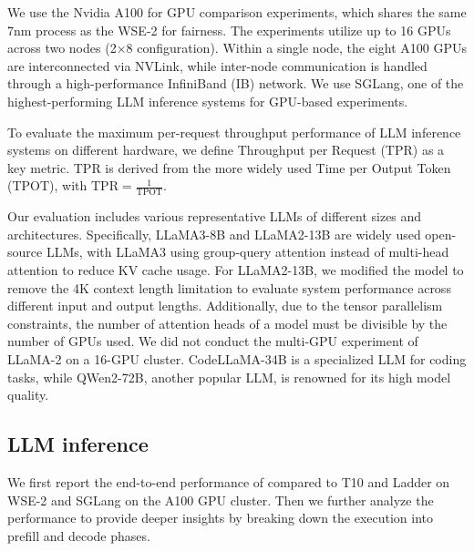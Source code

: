 We use the Nvidia A100 for GPU comparison experiments, which shares the same 7nm process as the WSE-2 for fairness. The experiments utilize up to 16 GPUs across two nodes (2$\times$8 configuration). Within a single node, the eight A100 GPUs are interconnected via NVLink, while inter-node communication is handled through a high-performance InfiniBand (IB) network. We use SGLang\cite{sglang}, one of the highest-performing LLM inference systems for GPU-based experiments.

 To evaluate the maximum per-request throughput performance of LLM inference systems on different hardware, we define Throughput per Request (TPR) as a key metric. TPR is derived from the more widely used Time per Output Token (TPOT), with $\text{TPR} = \frac{1}{\text{TPOT}}$.

Our evaluation includes various representative LLMs of different sizes and architectures. Specifically, LLaMA3-8B and LLaMA2-13B are widely used open-source LLMs, with LLaMA3 using group-query attention instead of multi-head attention to reduce KV cache usage. For LLaMA2-13B, we modified the model to remove the 4K context length limitation to evaluate system performance across different input and output lengths. Additionally, due to the tensor parallelism constraints, the number of attention heads of a model must be divisible by the number of GPUs used. We did not conduct the multi-GPU experiment of LLaMA-2 on a 16-GPU cluster. CodeLLaMA-34B is a specialized LLM for coding tasks, while QWen2-72B, another popular LLM, is renowned for its high model quality.

\vspace{-0.2cm}
\subsection{LLM inference} \label{sec:eval:e2e}

We first report the end-to-end performance of \sys compared to T10 and Ladder on WSE-2 and SGLang on the A100 GPU cluster. Then we further analyze the performance to provide deeper insights by breaking down the execution into prefill and decode phases.

